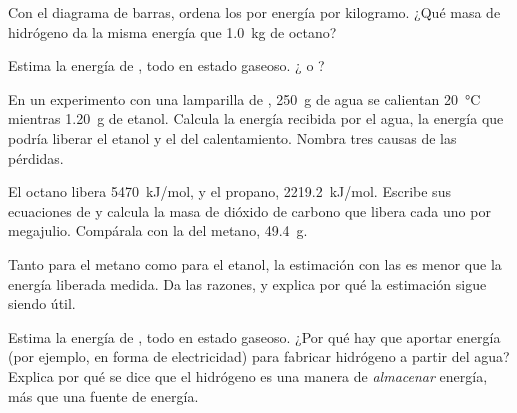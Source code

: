 \begin{exercise}[$\star\star$]\label{exo:g11:reaction-energy:10}
Con el diagrama de barras, ordena los  por energía por
kilogramo. ¿Qué masa de hidrógeno da la misma energía que \qty{1.0}{kg}
de octano?
\end{exercise}

\begin{exercise}[$\star\star$]\label{exo:g11:reaction-energy:11}
Estima la energía de , todo en estado gaseoso.
¿ o ?
\end{exercise}

\begin{exercise}[$\star\star\star$]\label{exo:g11:reaction-energy:12}
En un experimento con una lamparilla de , \qty{250}{g} de agua se
calientan \qty{20}{\celsius} mientras  \qty{1.20}{g} de etanol.
Calcula la energía recibida por el agua, la energía que podría liberar
el etanol y el  del calentamiento. Nombra tres causas de las
pérdidas.
\end{exercise}

\begin{exercise}[$\star\star\star$]\label{exo:g11:reaction-energy:13}
El octano libera \qty{5470}{kJ/mol}, y el propano, \qty{2219.2}{kJ/mol}.
Escribe sus ecuaciones de  y calcula la masa de dióxido de
carbono que libera cada uno por megajulio. Compárala con la del metano,
\qty{49.4}{g}.
\end{exercise}

\begin{exercise}[$\star\star\star$]\label{exo:g11:reaction-energy:14}
Tanto para el metano como para el etanol, la estimación con las  es menor que la energía liberada medida. Da las razones, y
explica por qué la estimación sigue siendo útil.
\end{exercise}

\begin{exercise}[$\star\star\star$]\label{exo:g11:reaction-energy:15}
Estima la energía de , todo en estado gaseoso. ¿Por
qué hay que aportar energía (por ejemplo, en forma de electricidad) para
fabricar hidrógeno a partir del agua? Explica por qué se dice que el
hidrógeno es una manera de \emph{almacenar} energía, más que una fuente
de energía.
\end{exercise}

